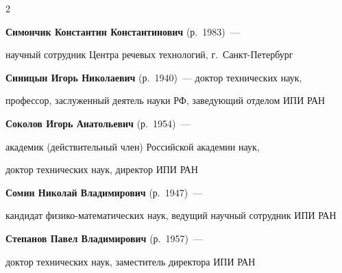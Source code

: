 \begin{multicols}{2}
{}%

 \def\rightfootline{\small{ИНФОРМАТИКА И ЕЁ ПРИМЕНЕНИЯ\ \ \ том~6\ \ \ выпуск~1\ \ \ 2012

\hfill \textbf{\thepage}}}



\noindent

\textbf{Симончик Константин Константинович} (р.\ 1983)~--- 

научный сотрудник Центра речевых технологий, г.~Санкт-Пе\-тер\-бург



\vspace*{4pt}



\noindent

\textbf{Синицын Игорь Николаевич} (р.\ 1940)~--- доктор технических наук, 

профессор, заслуженный деятель науки РФ, заведующий отделом ИПИ РАН



\vspace*{4pt}





\noindent 

\textbf{Соколов Игорь Анатольевич} (р.\ 1954)~---

академик (действительный член) Российской академии наук,

доктор технических наук, директор ИПИ РАН



\vspace*{4pt}



\noindent

\textbf{Сомин Николай Владимирович} (р.\ 1947)~--- 

кандидат физико-математических наук, ведущий научный сотрудник ИПИ РАН



\vspace*{4pt}



\noindent

\textbf{Степанов Павел Владимирович} (р.\ 1957)~--- 

доктор технических наук, заместитель директора ИПИ РАН

\columnbreak







\end{multicols}
